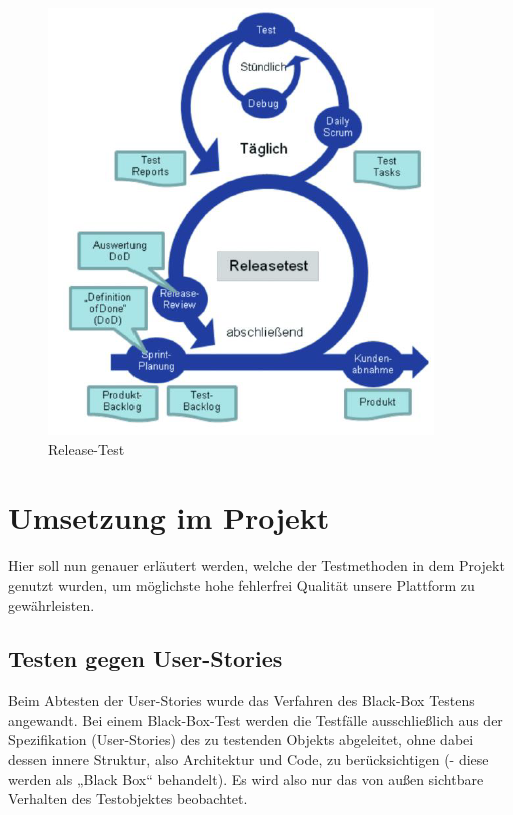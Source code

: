 \begin{figure}[!htb]
  \centering
  \includegraphics[width=.9\textwidth]{figures/rebecca/Release_Test.png}
  \caption[]{Release-Test}
  \label{fig:ReleaseTest}
\end{figure}

\section{Umsetzung im Projekt}
\label{sec:UmsetzungTest}

Hier soll nun genauer erläutert werden, welche der Testmethoden in dem Projekt genutzt wurden, um möglichste hohe fehlerfrei Qualität unsere Plattform zu gewährleisten.

\subsection{Testen gegen User-Stories}
\label{sub:UmsetzungTestGGUserStories}

Beim Abtesten der User-Stories wurde das Verfahren des Black-Box Testens angewandt. Bei einem Black-Box-Test werden die Testfälle ausschließlich aus der Spezifikation (User-Stories) des zu testenden Objekts abgeleitet, ohne dabei dessen innere Struktur, also Architektur und Code, zu berücksichtigen (- diese werden als „Black Box“ behandelt). Es wird also nur das von außen sichtbare Verhalten des Testobjektes beobachtet.

